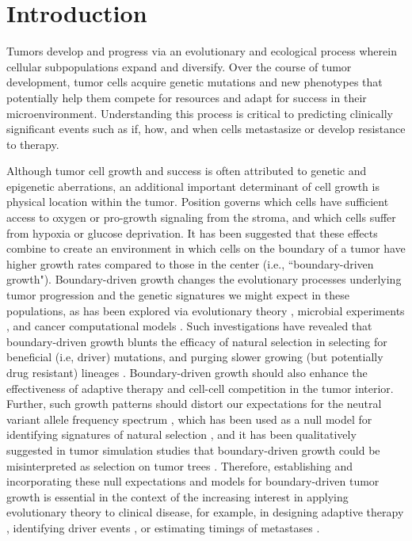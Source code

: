 \documentclass[12pt]{elife_based}
\begin{document}
\section{Introduction}

Tumors develop and progress via an evolutionary and ecological process wherein cellular subpopulations expand and diversify. Over the course of tumor development, tumor cells acquire genetic mutations and new phenotypes that potentially help them compete for resources and adapt for success in their microenvironment. Understanding this process is critical to predicting clinically significant events such as if, how, and when cells metastasize or develop resistance to therapy. 

Although tumor cell growth and success is often attributed to genetic and epigenetic aberrations, an additional important determinant of cell growth is physical location within the tumor. Position governs which cells have sufficient access to oxygen or pro-growth signaling from the stroma, and which cells suffer from hypoxia or glucose deprivation.  
It has been suggested that these effects combine to create an environment in which cells on the boundary of a tumor have higher growth rates compared to those in the center (i.e., ``boundary-driven growth"). Boundary-driven growth changes the evolutionary processes underlying tumor progression and the genetic signatures we might expect in these populations, as has been explored via evolutionary theory \citep{edmonds2004mutations, klopfstein2006fate}, microbial experiments \citep{hallatschek2007genetic, korolev2012selective, gralka2016allele}, and cancer computational models \citep{waclaw2015spatial, sottoriva2015big, sun2017between, ahmed2018intratumor, Chkhaidze:2019uw, noble2022}. Such investigations have revealed that boundary-driven growth blunts the efficacy of natural selection in selecting for beneficial (i.e, driver) mutations, and purging slower growing (but potentially drug resistant) lineages \citep{kayser2019collective}. Boundary-driven growth should also enhance the effectiveness of adaptive therapy \citep{bacevic2017spatial, strobl2022spatial} and cell-cell competition in the tumor interior. Further, such growth patterns should distort our expectations for the neutral variant allele frequency spectrum \citep{fusco2016excess}, which has been used as a null model for identifying signatures of natural selection \citep{williams2016identification}, and it has been qualitatively suggested in tumor simulation studies that boundary-driven growth could be misinterpreted as selection on tumor trees \citep{Chkhaidze:2019uw}. Therefore, establishing and incorporating these null expectations and models for boundary-driven tumor growth is essential in the context of the increasing interest in applying evolutionary theory to clinical disease, for example, in designing adaptive therapy \citep{You:2017vg}, identifying driver events \citep{Turajlic2018_tracerx, Gerstung2020}, or estimating timings of metastases \citep{Yachida2010_mets, ahmed2018intratumor}. 
\end{document}
